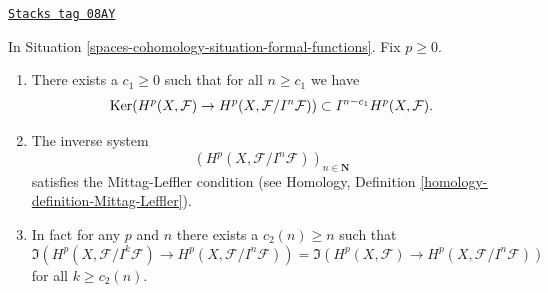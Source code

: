 \begin{lemma}
\label{spaces-cohomology-lemma-ML-cohomology-powers-ideal}
\href{https://stacks.math.columbia.edu/tag/08AY}{\texttt{Stacks tag 08AY}}

In Situation \ref{spaces-cohomology-situation-formal-functions}.
Fix $p \geq 0$.
\begin{enumerate}
\item There exists a $c_1 \geq 0$ such that for all $n \geq c_1$
we have
$$
\operatorname{Ker}(
H^p(X, \mathcal{F}) \to H^p(X, \mathcal{F}/I^n\mathcal{F})
)
\subset
I^{n - c_1}H^p(X, \mathcal{F}).
$$
\item The inverse system
$$
\left(H^p(X, \mathcal{F}/I^n\mathcal{F})\right)_{n \in \mathbf{N}}
$$
satisfies the Mittag-Leffler condition (see
Homology, Definition \ref{homology-definition-Mittag-Leffler}).
\item In fact for any $p$ and $n$ there exists a $c_2(n) \geq n$
such that
$$
\Im(H^p(X, \mathcal{F}/I^k\mathcal{F})
\to H^p(X, \mathcal{F}/I^n\mathcal{F}))
=
\Im(H^p(X, \mathcal{F})
\to H^p(X, \mathcal{F}/I^n\mathcal{F}))
$$
for all $k \geq c_2(n)$.
\end{enumerate}
\end{lemma}

